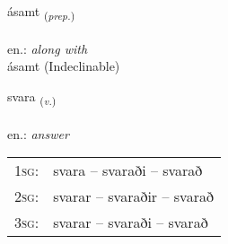 \documentclass[frontgrid, backgrid]{flacards}\usepackage[]{graphicx}\usepackage[]{xcolor}
\begin{document}

\renewcommand{\flhead}{\vskip5pt \fboxsep=0pt {\small\bfseries\footnotesize Forsetning | Preposition}}
\renewcommand{\fcfoot}{\vskip5pt \fboxsep=0pt \hspace{2pt}{\small\bfseries\footnotesize 1K}}

\renewcommand{\blhead}{\vskip5pt {\small\bfseries\footnotesize Forsetning | Preposition }}
\renewcommand{\bcfoot}{\vskip5pt \hspace{2pt}{\small\bfseries\footnotesize 1K}}


{ásamt \small{\textsubscript{(\textit{prep.})}} \\[1ex]
\textphonetic{[auːsam̥t]} \\
en.: \emph{along with} \\  [2ex]
ásamt (Indeclinable)}

\renewcommand{\flhead}{\vskip5pt \fboxsep=0pt {\small\bfseries\footnotesize Sagnorð | Verb}}
\renewcommand{\fcfoot}{\vskip5pt \fboxsep=0pt \hspace{2pt}{\small\bfseries\footnotesize 1K}}

\renewcommand{\blhead}{\vskip5pt {\small\bfseries\footnotesize Sagnorð | Verb }}
\renewcommand{\bcfoot}{\vskip5pt \hspace{2pt}{\small\bfseries\footnotesize 1K}}


{svara \small{\textsubscript{(\textit{v.})}} \\[1ex] %
\textphonetic{[svaːra]} \\
en.: \emph{answer} \\  [2ex]
\renewcommand*{\arraystretch}{0.8}
\begin{tabular}{p{1cm}l}
\textsc{1sg}: & svara -- svaraði -- svarað \\ 
\textsc{2sg}: & svarar -- svaraðir -- svarað \\ 
\textsc{3sg}: & svarar -- svaraði -- svarað \\ 
\end{tabular}
}
\end{document}
